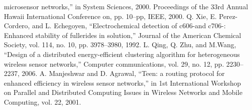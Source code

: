 \documentclass{article}
\begin{document}
\begin{thebibliography}{00}
microsensor networks,” in System Sciences, 2000. Proceedings
of the 33rd Annual Hawaii International Conference
on, pp. 10–pp, IEEE, 2000.
 Q. Xie, E. Perez-Cordero, and L. Echegoyen, “Electrochemical
detection of c606-and c706-: Enhanced stability
of fullerides in solution,” Journal of the American
Chemical Society, vol. 114, no. 10, pp. 3978–3980,
1992.
 L. Qing, Q. Zhu, and M.Wang, “Design of a distributed
energy-efficient clustering algorithm for heterogeneous
wireless sensor networks,” Computer communications,
vol. 29, no. 12, pp. 2230–2237, 2006.
 A. Manjeshwar and D. Agrawal, “Teen: a routing protocol
for enhanced efficiency in wireless sensor networks,”
in 1st International Workshop on Parallel and
Distributed Computing Issues in Wireless Networks and
Mobile Computing, vol. 22, 2001.

\end{thebibliography}
\end{document}
